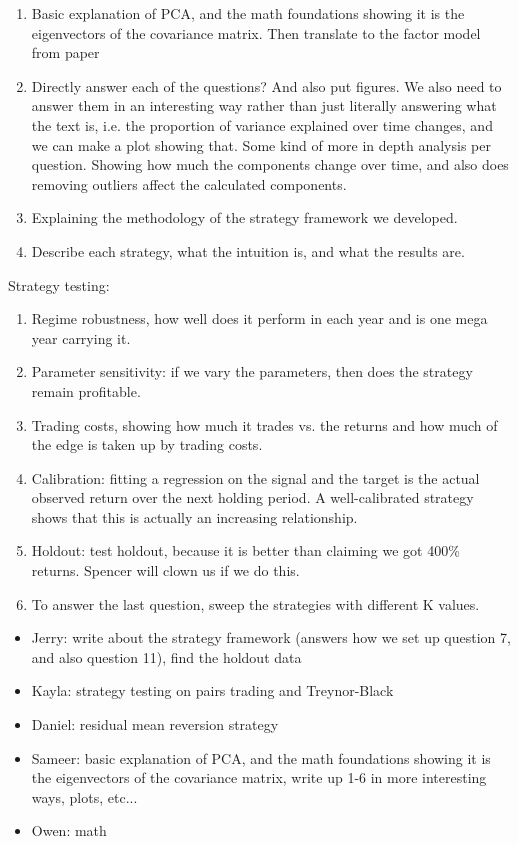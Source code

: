 \documentclass[12pt,letterpaper]{article}
\begin{document}
\begin{enumerate}
    \item Basic explanation of PCA, and the math foundations showing it is the eigenvectors of the covariance matrix. Then translate to the factor model from paper
    \item Directly answer each of the questions? And also put figures. We also need to answer them in an interesting way rather than just literally answering what the text is, i.e. the proportion of variance explained over time changes, and we can make a plot showing that. Some kind of more in depth analysis per question. Showing how much the components change over time, and also does removing outliers affect the calculated components.
    \item Explaining the methodology of the strategy framework we developed.
    \item Describe each strategy, what the intuition is, and what the results are.
\end{enumerate}

Strategy testing:
\begin{enumerate}
    \item Regime robustness, how well does it perform in each year and is one mega year carrying it.
    \item Parameter sensitivity: if we vary the parameters, then does the strategy remain profitable.
    \item Trading costs, showing how much it trades vs. the returns and how much of the edge is taken up by trading costs.
    \item Calibration: fitting a regression on the signal and the target is the actual observed return over the next holding period. A well-calibrated strategy shows that this is actually an increasing relationship.
    \item Holdout: test holdout, because it is better than claiming we got 400\% returns. Spencer will clown us if we do this.
    \item To answer the last question, sweep the strategies with different K values.
\end{enumerate}

\begin{itemize}
    \item Jerry: write about the strategy framework (answers how we set up question 7, and also question 11), find the holdout data
    \item Kayla: strategy testing on pairs trading and Treynor-Black
    \item Daniel: residual mean reversion strategy 
    \item Sameer: basic explanation of PCA, and the math foundations showing it is the eigenvectors of the covariance matrix, write up 1-6 in more interesting ways, plots, etc...
    \item Owen: math
\end{itemize}
\newpage
\end{document}
